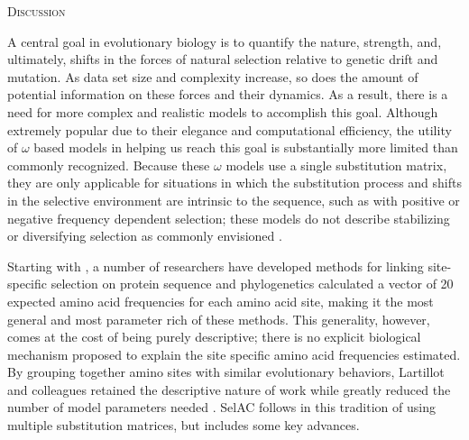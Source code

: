 \documentclass[12pt,letterpaper,fleqn]{article}
\renewcommand{\section}[1]{%
\bigskip
\begin{center}
\begin{Large}
\normalfont\scshape #1
\medskip
\end{Large}
\end{center}}
\newcommand{\selac}{SelAC\xspace}
\begin{document}
\section{Discussion}
A central goal in evolutionary biology is to quantify the nature, strength, and, ultimately, shifts in the forces of natural selection relative to genetic drift and mutation.
As data set size and complexity increase, so does the amount of potential information on these forces and their dynamics.
As a result, there is a need for more complex and realistic models \citep{GoldmanEtAl1996,ThorneEtAl1996,GoldmanEtAl1998,HalpernAndBruno1998,LartillotAndPhilippe2004} to accomplish this goal.
Although extremely popular due to their elegance and computational efficiency, the utility of $\omega$ based models in helping us reach this goal is substantially more limited than commonly recognized.
Because these $\omega$ models use a single substitution matrix, they are only applicable for situations in which the substitution process and shifts in the selective environment are intrinsic to the sequence, such as with positive or negative frequency dependent selection; these models do not describe stabilizing or diversifying selection as commonly envisioned \citep{Endler1986a,Pelmyr2002}.

Starting with \citet{HalpernAndBruno1998}, a number of researchers have developed methods for linking site-specific selection on protein sequence and phylogenetics \citep[e.g.~][]{KoshiEtAl1999,DimmicEtAl2000,KoshiAndGoldstein2001,RobinsonEtAl2003,LartillotAndPhilippe2004,ThorneEtAl2012,RodrigueAndLartillot2014}
\citet{HalpernAndBruno1998} calculated  a vector of 20 expected amino acid frequencies for each amino acid site, making it the most general and most parameter rich of these methods.
This generality, however, comes at the cost of being purely descriptive; there is no explicit biological mechanism proposed to explain the site specific amino acid frequencies estimated.
By grouping together amino sites with similar evolutionary behaviors, Lartillot and colleagues retained the descriptive nature of \citet{HalpernAndBruno1998} work while greatly reduced the number of model parameters needed \citep{LartillotAndPhilippe2004,RodrigueAndLartillot2014}.
\selac follows in this tradition of using multiple substitution matrices, but includes some key advances.
\end{document}
